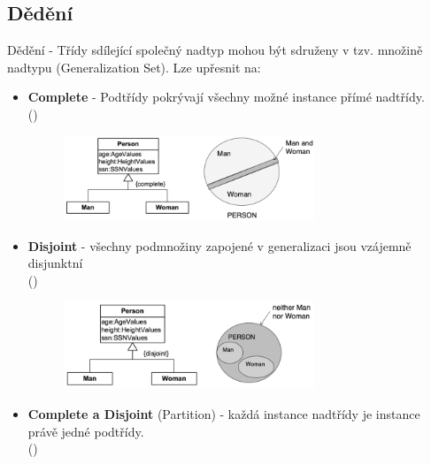 \documentclass{szzclass}
\begin{document}
\subsection{Dědění}
Dědění - Třídy sdílející společný nadtyp mohou být sdruženy v tzv. množině nadtypu (Generalization Set). Lze upřesnit na:
\begin{itemize}
\item \textbf{Complete} - Podtřídy pokrývají všechny možné instance přímé nadtřídy.\\
  \hfill (\emph{})
\begin{figure}[!h]
  \centering
  \includegraphics[width=7.5cm]{topics/bi-wsi-si-06/images/complete.png}
\end{figure}

\item \textbf{Disjoint} - všechny podmnožiny zapojené v generalizaci jsou vzájemně disjunktní\\
  \hfill (\emph{})
\begin{figure}[!h]
  \centering
  \includegraphics[width=7.5cm]{topics/bi-wsi-si-06/images/disjoint.png}
\end{figure}

\item \textbf{Complete a Disjoint} (Partition) - každá instance nadtřídy je instance právě jedné podtřídy.\\
  \hfill (\emph{})
\end{itemize}
\end{document}
